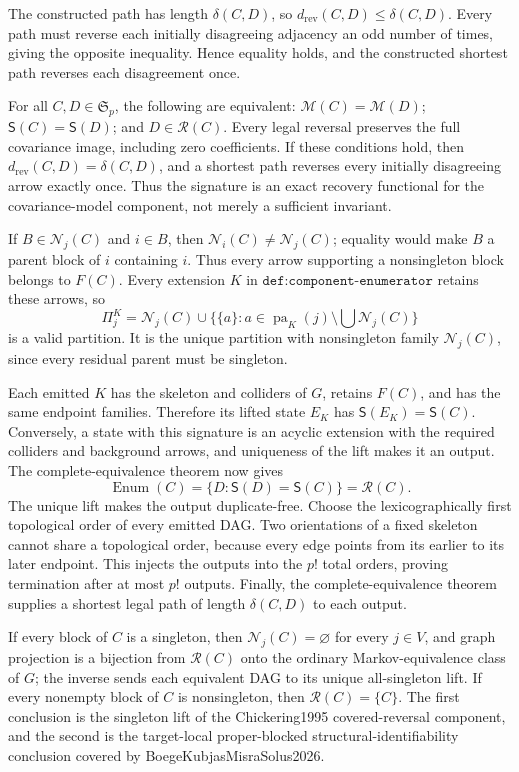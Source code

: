 The constructed path has length \(\delta(C,D)\), so \(d_{\mathrm{rev}}(C,D)\le\delta(C,D)\).  Every path must reverse each initially disagreeing adjacency an odd number of times, giving the opposite inequality.  Hence equality holds, and the constructed shortest path reverses each disagreement once.

For all \(C,D\in\mathfrak S_p\), the following are equivalent: \(\mathcal M(C)=\mathcal M(D)\); \(\mathsf S(C)=\mathsf S(D)\); and \(D\in\mathcal R(C)\). Every legal reversal preserves the full covariance image, including zero coefficients. If these conditions hold, then \(d_{\mathrm{rev}}(C,D)=\delta(C,D)\), and a shortest path reverses every initially disagreeing arrow exactly once. Thus the signature is an exact recovery functional for the covariance-model component, not merely a sufficient invariant.

If \(B\in\mathcal N_j(C)\) and \(i\in B\), then \(\mathcal N_i(C)\ne\mathcal N_j(C)\); equality would make \(B\) a parent block of \(i\) containing \(i\).  Thus every arrow supporting a nonsingleton block belongs to \(F(C)\).  Every extension \(K\) in \(\texttt{def:component-enumerator}\) retains these arrows, so
\[
 \Pi^K_j=\mathcal N_j(C)\cup
 \{\{a\}:a\in\operatorname{pa}_K(j)\setminus\bigcup\mathcal N_j(C)\}
\]
is a valid partition.  It is the unique partition with nonsingleton family \(\mathcal N_j(C)\), since every residual parent must be singleton.

Each emitted \(K\) has the skeleton and colliders of \(G\), retains \(F(C)\), and has the same endpoint families.  Therefore its lifted state \(E_K\) has \(\mathsf S(E_K)=\mathsf S(C)\).  Conversely, a state with this signature is an acyclic extension with the required colliders and background arrows, and uniqueness of the lift makes it an output.  The complete-equivalence theorem now gives
\[
 \operatorname{Enum}(C)=\{D:\mathsf S(D)=\mathsf S(C)\}=\mathcal R(C).
\]
The unique lift makes the output duplicate-free.  Choose the lexicographically first topological order of every emitted DAG.  Two orientations of a fixed skeleton cannot share a topological order, because every edge points from its earlier to its later endpoint.  This injects the outputs into the \(p!\) total orders, proving termination after at most \(p!\) outputs.  Finally, the complete-equivalence theorem supplies a shortest legal path of length \(\delta(C,D)\) to each output.

If every block of \(C\) is a singleton, then \(\mathcal N_j(C)=\varnothing\) for every \(j\in V\), and graph projection is a bijection from \(\mathcal R(C)\) onto the ordinary Markov-equivalence class of \(G\); the inverse sends each equivalent DAG to its unique all-singleton lift.  If every nonempty block of \(C\) is nonsingleton, then \(\mathcal R(C)=\{C\}\).  The first conclusion is the singleton lift of the Chickering1995 covered-reversal component, and the second is the target-local proper-blocked structural-identifiability conclusion covered by BoegeKubjasMisraSolus2026.

